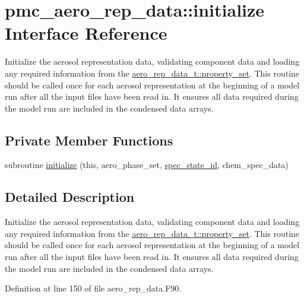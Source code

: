 \hypertarget{interfacepmc__aero__rep__data_1_1initialize}{}\section{pmc\+\_\+aero\+\_\+rep\+\_\+data\+:\+:initialize Interface Reference}
\label{interfacepmc__aero__rep__data_1_1initialize}


Initialize the aerosol representation data, validating component data and loading any required information from the {\ttfamily \mbox{\hyperlink{structpmc__aero__rep__data_1_1aero__rep__data__t_a87b1bf5cd10a0a2b51390fb24ebf56c5}{aero\+\_\+rep\+\_\+data\+\_\+t\+::property\+\_\+set}}}. This routine should be called once for each aerosol representation at the beginning of a model run after all the input files have been read in. It ensures all data required during the model run are included in the condensed data arrays.  


\subsection*{Private Member Functions}
\begin{DoxyCompactItemize}
\item 
subroutine \mbox{\hyperlink{interfacepmc__aero__rep__data_1_1initialize_adc79509dabc5a287cfa82c9a2a9e930d}{initialize}} (this, aero\+\_\+phase\+\_\+set, \mbox{\hyperlink{interfacepmc__aero__rep__data_1_1spec__state__id}{spec\+\_\+state\+\_\+id}}, chem\+\_\+spec\+\_\+data)
\end{DoxyCompactItemize}


\subsection{Detailed Description}
Initialize the aerosol representation data, validating component data and loading any required information from the {\ttfamily \mbox{\hyperlink{structpmc__aero__rep__data_1_1aero__rep__data__t_a87b1bf5cd10a0a2b51390fb24ebf56c5}{aero\+\_\+rep\+\_\+data\+\_\+t\+::property\+\_\+set}}}. This routine should be called once for each aerosol representation at the beginning of a model run after all the input files have been read in. It ensures all data required during the model run are included in the condensed data arrays. 

Definition at line 150 of file aero\+\_\+rep\+\_\+data.\+F90.



